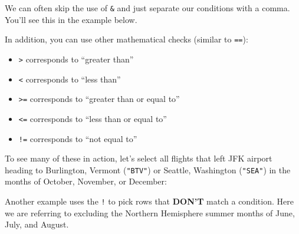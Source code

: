 \documentclass[]{tufte-book}
\newenvironment{Shaded}{\begin{snugshade}}{\end{snugshade}}
\newcommand{\KeywordTok}[1]{\textcolor[rgb]{0.13,0.29,0.53}{\textbf{{#1}}}}
\newcommand{\DecValTok}[1]{\textcolor[rgb]{0.00,0.00,0.81}{{#1}}}
\newcommand{\StringTok}[1]{\textcolor[rgb]{0.31,0.60,0.02}{{#1}}}
\newcommand{\NormalTok}[1]{{#1}}
\providecommand{\tightlist}{%
  \setlength{\itemsep}{0pt}\setlength{\parskip}{0pt}}
\begin{document}
We can often skip the use of \texttt{\&} and just separate our
conditions with a comma. You'll see this in the example below.

In addition, you can use other mathematical checks (similar to
\texttt{==}):

\begin{itemize}
\tightlist
\item
  \texttt{\textgreater{}} corresponds to ``greater than''
\item
  \texttt{\textless{}} corresponds to ``less than''
\item
  \texttt{\textgreater{}=} corresponds to ``greater than or equal to''
\item
  \texttt{\textless{}=} corresponds to ``less than or equal to''
\item
  \texttt{!=} corresponds to ``not equal to''
\end{itemize}

To see many of these in action, let's select all flights that left JFK
airport heading to Burlington, Vermont (\texttt{"BTV"}) or Seattle,
Washington (\texttt{"SEA"}) in the months of October, November, or
December:

\begin{Shaded}
\end{Shaded}

Another example uses the \texttt{!} to pick rows that \textbf{DON'T}
match a condition. Here we are referring to excluding the Northern
Hemisphere summer months of June, July, and August.

\begin{Shaded}
\end{Shaded}
\end{document}
